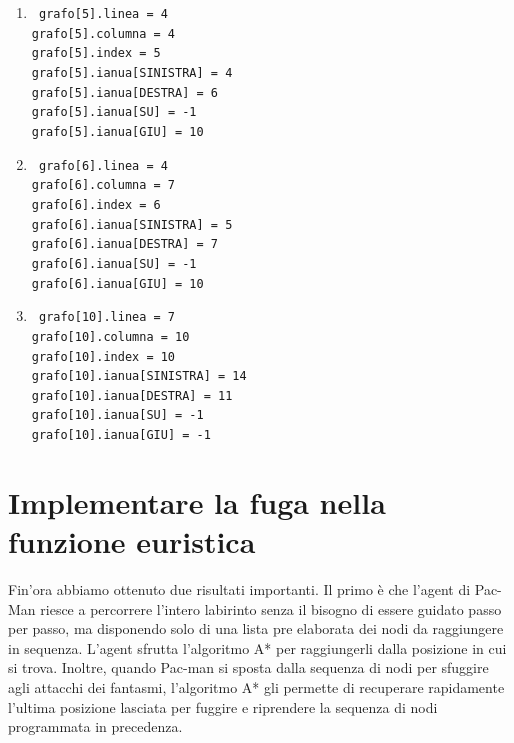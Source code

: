 \documentclass[8pt]{book}
\begin{document}
\begin{enumerate}
\begin{enumerate}
\item
  \texttt{
  grafo{[}5{]}.linea = 4\\
  grafo{[}5{]}.columna = 4\\
  grafo{[}5{]}.index = 5\\
  grafo{[}5{]}.ianua{[}SINISTRA{]} = 4\\
  grafo{[}5{]}.ianua{[}DESTRA{]} = 6\\
  grafo{[}5{]}.ianua{[}SU{]} = -1\\
  grafo{[}5{]}.ianua{[}GIU{]} = 10\\
  }
\item
  \texttt{
  grafo{[}6{]}.linea = 4\\
  grafo{[}6{]}.columna = 7\\
  grafo{[}6{]}.index = 6\\
  grafo{[}6{]}.ianua{[}SINISTRA{]} = 5\\
  grafo{[}6{]}.ianua{[}DESTRA{]} = 7\\
  grafo{[}6{]}.ianua{[}SU{]} = -1\\
  grafo{[}6{]}.ianua{[}GIU{]} = 10\\
  }
\item
  \texttt{
  grafo{[}10{]}.linea = 7\\
  grafo{[}10{]}.columna = 10\\
  grafo{[}10{]}.index = 10\\
  grafo{[}10{]}.ianua{[}SINISTRA{]} = 14\\
  grafo{[}10{]}.ianua{[}DESTRA{]} = 11\\
  grafo{[}10{]}.ianua{[}SU{]} = -1\\
  grafo{[}10{]}.ianua{[}GIU{]} = -1\\
  }
\end{enumerate}

\end{enumerate}


\chapter[Fuga in funzione euristica]{Implementare la fuga nella funzione euristica}

Fin'ora abbiamo ottenuto due risultati importanti. Il primo è che l'agent di Pac-Man riesce a percorrere l'intero labirinto senza il bisogno di essere guidato passo per passo, ma disponendo solo di una lista pre elaborata dei nodi da raggiungere in sequenza. L'agent sfrutta l'algoritmo A* per raggiungerli dalla posizione in cui si trova. Inoltre, quando Pac-man si sposta dalla sequenza di nodi per sfuggire agli attacchi dei fantasmi, l'algoritmo A* gli permette di recuperare rapidamente l'ultima posizione lasciata per fuggire e riprendere la sequenza di nodi programmata in precedenza.
\end{document}
